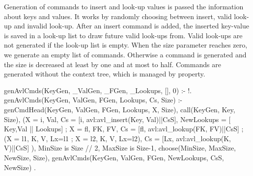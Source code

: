Generation of commands to insert and look-up values is passed the
information about keys and values.
%
It works by randomly choosing between insert, valid look-up and invalid
look-up.
%
After an insert command is added, the inserted key-value is saved in a
look-up list to draw future valid look-ups from.
%
Valid look-ups are not generated if the look-up list is empty.
%
When the size parameter reaches zero, we generate an empty list of
commands.
%
Otherwise a command is generated and the size is decreased at least by
one and at most to half.
%
Commands are generated without the context tree, which is managed by property.
%
\begin{yapcode}
 genAvlCmds(KeyGen, _ValGen, _FGen,
            _Lookups, [], 0) :- !.
 genAvlCmds(KeyGen, ValGen, FGen,
            Lookups, Cs, Size) :-
   genCmdHead(KeyGen, ValGen, FGen,
              Lookups, X, Size),
   call(KeyGen, Key, Size),
   (X = {i, Val},
    Cs = [{i, avl:avl_insert(Key, Val)}||CsS],
    NewLookups = [ {Key,Val} || Lookups]
   ;
    X = {fl, {FK, FV}},
    Cs = [{fl, avl:avl_lookup(FK, FV)}||CsS]
   ;
    (X = {l1, {K, V}}, Lx=l1
    ; X = {l2, {K, V}}, Lx=l2),
    Cs = [{Lx, avl:avl_lookup(K, V)}||CsS]
   ),
   MinSize is Size // 2,
   MaxSize is Size-1,
   choose(MinSize, MaxSize, NewSize, Size),
   genAvlCmds(KeyGen, ValGen, FGen,
              NewLookups, CsS, NewSize)
 .
\end{yapcode}



